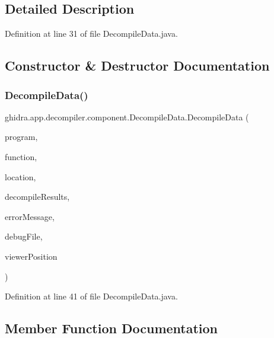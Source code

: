 \subsection{Detailed Description}


Definition at line 31 of file Decompile\+Data.\+java.



\subsection{Constructor \& Destructor Documentation}
\mbox{\label{classghidra_1_1app_1_1decompiler_1_1component_1_1_decompile_data_a3805009a5dd175e773c05baf6e932890}} 
\subsubsection{\texorpdfstring{DecompileData()}{DecompileData()}}
{\footnotesize\ttfamily ghidra.\+app.\+decompiler.\+component.\+Decompile\+Data.\+Decompile\+Data (\begin{DoxyParamCaption}\item[{Program}]{program,  }\item[{Function}]{function,  }\item[{Program\+Location}]{location,  }\item[{\mbox{\hyperlink{classghidra_1_1app_1_1decompiler_1_1_decompile_results}{Decompile\+Results}}}]{decompile\+Results,  }\item[{String}]{error\+Message,  }\item[{File}]{debug\+File,  }\item[{Viewer\+Position}]{viewer\+Position }\end{DoxyParamCaption})\hspace{0.3cm}{\ttfamily [inline]}}



Definition at line 41 of file Decompile\+Data.\+java.



\subsection{Member Function Documentation}
\mbox{\label{classghidra_1_1app_1_1decompiler_1_1component_1_1_decompile_data_abcc52036aeb7616c47c98e5314c7c8bd}} 
